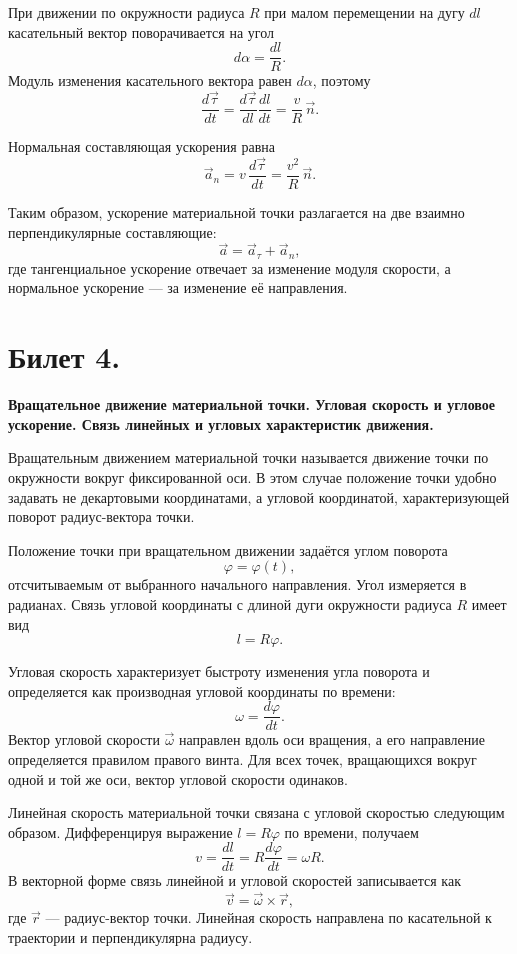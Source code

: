 \documentclass[a4paper,12pt]{article}
\begin{document}
При движении по окружности радиуса \(R\) при малом перемещении на дугу
\(dl\) касательный вектор поворачивается на угол
\[
d\alpha = \frac{dl}{R}.
\]
Модуль изменения касательного вектора равен \(d\alpha\), поэтому
\[
\frac{d\vec\tau}{dt}
= \frac{d\vec\tau}{dl}\frac{dl}{dt}
= \frac{v}{R}\,\vec n.
\]

Нормальная составляющая ускорения равна
\[
\vec a_n = v\,\frac{d\vec\tau}{dt}
= \frac{v^2}{R}\,\vec n.
\]

Таким образом, ускорение материальной точки разлагается на две
взаимно перпендикулярные составляющие:
\[
\vec a = \vec a_\tau + \vec a_n,
\]
где тангенциальное ускорение отвечает за изменение модуля скорости,
а нормальное ускорение --- за изменение её направления.

\section{Билет 4.}
\textbf{Вращательное движение материальной точки. 
Угловая скорость и угловое ускорение. 
Связь линейных и угловых характеристик движения.}

Вращательным движением материальной точки называется движение точки
по окружности вокруг фиксированной оси. В этом случае положение точки
удобно задавать не декартовыми координатами, а угловой координатой,
характеризующей поворот радиус-вектора точки.

Положение точки при вращательном движении задаётся углом поворота
\[
\varphi = \varphi(t),
\]
отсчитываемым от выбранного начального направления. Угол измеряется
в радианах. Связь угловой координаты с длиной дуги окружности радиуса
\(R\) имеет вид
\[
l = R\varphi.
\]

Угловая скорость характеризует быстроту изменения угла поворота и
определяется как производная угловой координаты по времени:
\[
\omega = \frac{d\varphi}{dt}.
\]
Вектор угловой скорости \(\vec\omega\) направлен вдоль оси вращения,
а его направление определяется правилом правого винта. Для всех точек,
вращающихся вокруг одной и той же оси, вектор угловой скорости одинаков.

Линейная скорость материальной точки связана с угловой скоростью
следующим образом. Дифференцируя выражение \(l = R\varphi\) по времени,
получаем
\[
v = \frac{dl}{dt} = R\frac{d\varphi}{dt} = \omega R.
\]
В векторной форме связь линейной и угловой скоростей записывается как
\[
\vec v = \vec\omega \times \vec r,
\]
где \(\vec r\) --- радиус-вектор точки. Линейная скорость направлена по
касательной к траектории и перпендикулярна радиусу.
\end{document}
